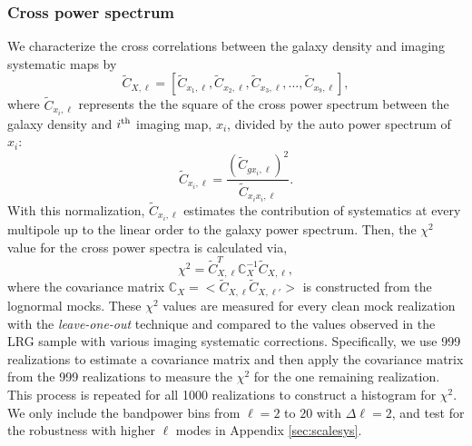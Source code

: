 \subsubsection{Cross power spectrum}

We characterize the cross correlations between the galaxy density and imaging systematic maps by
\begin{equation}
\tilde{C}_{X, \ell} = [\tilde{C}_{x_{1}, \ell}, \tilde{C}_{x_{2}, \ell}, \tilde{C}_{x_{3}, \ell}, ..., \tilde{C}_{x_{9}, \ell}],
\end{equation}
where $\tilde{C}_{x_{i}, \ell}$ represents the the square of the cross power spectrum between the galaxy density and $i^{\rm th}$ imaging map, $x_{i}$, divided by the auto power spectrum of $x_{i}$:
\begin{equation}\label{eq:cx}
\tilde{C}_{x_{i}, \ell} = \frac{(\tilde{C}_{gx_{i}, \ell})^{2}}{\tilde{C}_{x_{i}x_{i},\ell}}.
\end{equation}
With this normalization, $\tilde{C}_{x_{i}, \ell}$ estimates the contribution of systematics at every multipole up to the linear order to the galaxy power spectrum. Then, the $\chi^{2}$ value for the cross power spectra is calculated via,
\begin{equation}\label{eq:cx_chi2}
\chi^{2} = \tilde{C}^{T}_{X, \ell} \mathbb{C}_{X}^{-1} \tilde{C}_{X, \ell},
\end{equation}
where the covariance matrix $\mathbb{C}_{X} = < \tilde{C}_{X, \ell} \tilde{C}_{X, \ell'} >$ is constructed from the lognormal mocks. These $\chi^{2}$ values are measured for every clean mock realization with the \textit{leave-one-out} technique and compared to the values observed in the LRG sample with various imaging systematic corrections. Specifically, we use 999 realizations to estimate a covariance matrix and then apply the covariance matrix from the 999 realizations to measure the $\chi^{2}$ for the one remaining realization. This process is repeated for all 1000 realizations to construct a histogram for $\chi^{2}$. We only include the bandpower bins from $\ell=2$ to $20$ with $\Delta\ell=2$, and test for the robustness with higher $\ell$ modes in Appendix \ref{sec:scalesys}. 

